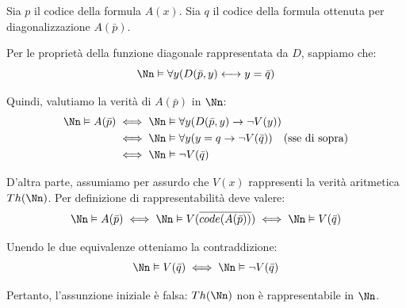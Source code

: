 \documentclass[a4paper,11pt]{report}
\begin{document}
\begin{proofframe}[title=dimostrazione breve]
    Sia \( p \) il codice della formula \( A(x) \).
    Sia \( q \) il codice della formula ottenuta per diagonalizzazione \( A(\bar{p}) \).

    Per le proprietà della funzione diagonale rappresentata da \( D \), sappiamo che:
    \[ \Nn \vDash \forall y (D(\bar{p}, y) \longleftrightarrow y = \bar{q}) \]

    Quindi, valutiamo la verità di \( A(\bar{p}) \) in \( \Nn \):
    \begin{align*}
        \Nn \vDash A(\bar{p}) & \iff \Nn \vDash \forall y (D(\bar{p}, y) \to \neg V(y)) \\
                              & \iff \Nn \vDash \forall y(y = q \to \neg V(\bar{q})) \quad \text{(sse di sopra)}\\
                              & \iff \Nn \vDash \neg V(\bar{q})     
    \end{align*}

    D'altra parte, assumiamo per assurdo che \( V(x) \) rappresenti la verità aritmetica \( Th(\Nn) \). Per definizione di rappresentabilità deve valere:
    \[ \Nn \vDash A(\bar{p}) \iff \Nn \vDash V(\overline{code(A(\bar{p}))}) \iff \Nn \vDash V(\bar{q}) \]

    Unendo le due equivalenze otteniamo la contraddizione:
    \[ \Nn \vDash V(\bar{q}) \iff \Nn \vDash \neg V(\bar{q}) \]

    Pertanto, l'assunzione iniziale è falsa: \( Th(\Nn) \) non è rappresentabile in \( \Nn \).
\end{proofframe}
\end{document}

